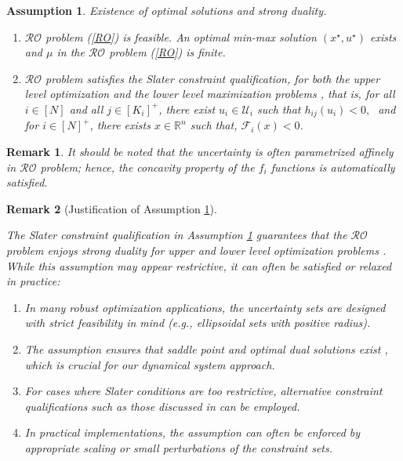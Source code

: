 \documentclass[journal,twoside,web]{ieeecolor}
\newcommand{\rev}[1]{\textcolor{revisionblue}{#1}}
\newtheorem{assumption}[theorem]{Assumption}
\newtheorem{remark}{Remark}
\begin{document}
\begin{assumption} \label{assume_feasible} Existence of optimal solutions and strong duality.

\begin{enumerate}
\item $\mathcal{RO}$ problem (\ref{RO}) is feasible. An optimal min-max solution $(x^\star,u^\star)$ exists and $\mu$ in the $\mathcal{RO}$ problem (\ref{RO}) is finite.
\item $\mathcal{RO}$ problem satisfies the Slater constraint qualification, for both the upper level optimization and the lower level maximization problems
 \cite{bental2009-2}, that is,
for all $i\in[N]$ and all $j\in[K_i]^+$, there exist $u_i \in \mathcal{U}_i$ such that $h_{ij}(u_i)<0,\;$  and
for $i\in[N]^+$,  there exists $x \in \mathbb{R}^n$ such that, $\mathcal{F}_i(x)<0$\;.
\end{enumerate}
\end{assumption}
\begin{remark}
    It should be noted that the uncertainty is often parametrized affinely in $\mathcal{RO}$ problem; hence, the concavity property of the $f_i$ functions is automatically satisfied.
\end{remark}
\begin{remark}[\rev{Justification of Assumption \ref{assume_feasible}}] \label{strong_duality_rem}
\rev{The Slater constraint qualification in Assumption \ref{assume_feasible} guarantees that the $\mathcal{RO}$ problem enjoys strong duality for upper and lower level optimization problems \cite[Section~5.2.3, 5.9.1]{boyd2004}. While this assumption may appear restrictive, it can often be satisfied or relaxed in practice:
\begin{enumerate}
\item In many robust optimization applications, the uncertainty sets are designed with strict feasibility in mind (e.g., ellipsoidal sets with positive radius).
\item The assumption ensures that saddle point and optimal dual solutions exist \cite{bental2009-2}, which is crucial for our dynamical system approach.
\item For cases where Slater conditions are too restrictive, alternative constraint qualifications such as those discussed in \cite{jeyakumar2010} can be employed.
\item In practical implementations, the assumption can often be enforced by appropriate scaling or small perturbations of the constraint sets.
\end{enumerate}}
\end{remark}
\end{document}
